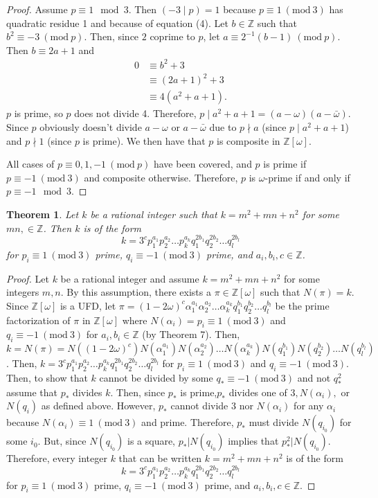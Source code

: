 \documentclass[12pt]{amsart}
\newtheorem{theorem}{Theorem}
\theoremstyle{definition}
\theoremstyle{remark}
\newcommand{\Mod}[1]{\ (\mathrm{mod}\ #1)}
\begin{document}
\begin{proof}
    Assume $p\equiv 1 \mod{3}$. Then $(-3\mid p) = 1$ because $p\equiv 1 \Mod3$ has quadratic residue 1 and because of equation (4). Let $b\in\mathbb{Z}$ such that $b^2\equiv -3 \Mod p$. Then, since $2$ coprime to $p$, let $a \equiv 2^{-1}(b-1)\Mod p$. Then $b \equiv 2a+1$ and 
    \begin{align*}
        0 &\equiv b^2+3\\
        &\equiv (2a+1)^2+3\\
        &\equiv 4(a^2+a+1).
    \end{align*}
    $p$ is prime, so $p$ does not divide 4. Therefore, $p\mid a^2+a+1 = (a-\omega)(a-\bar{\omega}).$ Since $p$ obviously doesn't divide $a-\omega$ or $a-\bar{\omega}$ due to $p \nmid a$ (since $p\mid a^2+a+1$) and $p\nmid 1$ (since $p$ is prime). We then have that $p$ is composite in $\mathbb{Z}[\omega]$.
    
    All cases of $p\equiv 0,1,-1 \Mod p$ have been covered, and $p$ is prime if $p\equiv -1\Mod 3$ and composite otherwise. Therefore, $p$ is $\omega$-prime if and only if $p\equiv -1 \mod{3}$.
\end{proof}

\begin{theorem}
    Let $k$ be a rational integer such that $k=m^2+mn+n^2$ for some $mn,\in\mathbb{Z}$. Then $k$ is of the form $$k = 3^cp_1^{a_1}p_2^{a_2}\dots p_k^{a_k}q_1^{2b_1}q_2^{2b_2}\dots q_l^{2b_l}$$ for $p_i\equiv 1\Mod3$ prime, $q_i\equiv -1 \Mod3$ prime, and $a_i,b_i,c\in\mathbb{Z}$.
\end{theorem}
\begin{proof}
    Let $k$ be a rational integer and assume $k=m^2+mn+n^2$ for some integers $m,n$. By this assumption, there exists a $\pi\in\mathbb{Z}[\omega]$ such that $N(\pi)=k$. Since $\mathbb{Z}[\omega]$ is a UFD, let $\pi = (1-2\omega)^c\alpha_1^{a_1}\alpha_2^{a_2}\dots\alpha_k^{a_k}q_1^{b_1}q_2^{b_2}\dots q_l^{b_l}$ be the prime factorization of $\pi$ in $\mathbb{Z}[\omega]$ where $N(\alpha_i)=p_i\equiv 1 \Mod3$ and $q_i\equiv -1 \Mod 3$ for $a_i,b_i\in\mathbb{Z}$ (by Theorem 7). Then, $k=N(\pi)=N((1-2\omega)^c)N(\alpha_1^{a_1})N(\alpha_2^{a_2})\dots N(\alpha_k^{a_k})N(q_1^{b_1})N(q_2^{b_2})\dots N(q_l^{b_l})$. Then, $k=3^cp_1^{a_1}p_2^{a_2}\dots p_k^{a_k}q_1^{2b_1}q_2^{2b_2}\dots q_l^{2b_l}$ for $p_i\equiv 1\Mod 3$ and $q_i\equiv -1\Mod3$. Then, to show that $k$ cannot be divided by some $q_*\equiv -1 \Mod3$ and not $q_*^2$ assume that $p_*$ divides $k$. Then, since $p_*$ is prime,$p_*$ divides one of $3,N(\alpha_i),$ or $N(q_i)$ as defined above. However, $p_*$ cannot divide $3$ nor $N(\alpha_i)$ for any $\alpha_i$ because $N(\alpha_i)\equiv 1 \Mod3$ and prime. Therefore, $p_*$ must divide $N(q_{i_0})$ for some $i_0$. But, since $N(q_{i_0})$ is a square, $p_*|N(q_{i_0})$ implies that $p_*^2|N(q_{i_0})$. Therefore, every integer $k$ that can be written $k=m^2+mn+n^2$ is of the form
    $$k = 3^cp_1^{a_1}p_2^{a_2}\dots p_k^{a_k}q_1^{2b_1}q_2^{2b_2}\dots q_l^{2b_l}$$
    for $p_i\equiv 1\Mod3$ prime, $q_i\equiv -1 \Mod3$ prime, and $a_i,b_i,c\in\mathbb{Z}$.
\end{proof}
\end{document}
